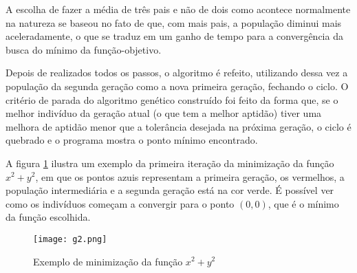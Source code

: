 A escolha de fazer a média de três pais e não de dois como acontece normalmente na natureza se baseou no fato de que, com mais pais, a população diminui mais aceleradamente, o que se traduz em um ganho de tempo para a convergência da busca do mínimo da função-objetivo.

Depois de realizados todos os passos, o algoritmo é refeito, utilizando dessa vez a população da segunda geração como a nova primeira geração, fechando o ciclo. O critério de parada do algoritmo genético construído foi feito da forma que, se o melhor indivíduo da geração atual (o que tem a melhor aptidão) tiver uma melhora de aptidão menor que a tolerância desejada na próxima geração, o ciclo é quebrado e o programa mostra o ponto mínimo encontrado. 

A figura \ref{fig:g2_x2y2} ilustra um exemplo da primeira iteração da minimização da função $ x^2 + y^2 $, em que os pontos azuis representam a primeira geração, os vermelhos, a população intermediária e a segunda geração está na cor verde. É possível ver como os indivíduos começam a convergir para o ponto $ (0,0) $, que é o mínimo da função escolhida.


\begin{figure}[H]
	\begin{center}
		\texttt{[image: g2.png]}   
		\caption{Exemplo de minimização da função $ x^2 + y^2 $}
		\label{fig:g2_x2y2}
	\end{center}
\end{figure}
\newpage




